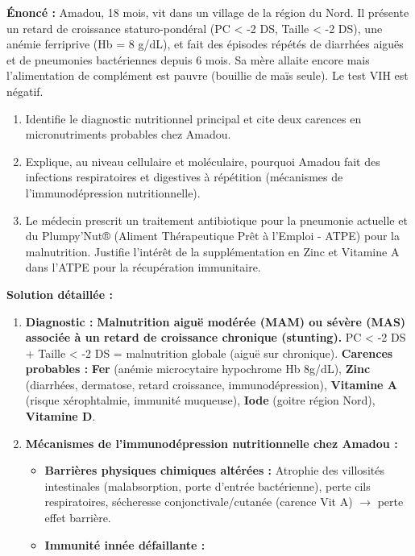 \documentclass[11pt]{article}
\begin{document}
\begin{exoresolu}
    \textbf{Énoncé :} Amadou, 18 mois, vit dans un village de la région du Nord. Il présente un retard de croissance staturo-pondéral (PC < -2 DS, Taille < -2 DS), une anémie ferriprive (Hb = 8 g/dL), et fait des épisodes répétés de diarrhées aiguës et de pneumonies bactériennes depuis 6 mois. Sa mère allaite encore mais l'alimentation de complément est pauvre (bouillie de maïs seule). Le test VIH est négatif.
    \begin{enumerate}
        \item Identifie le diagnostic nutritionnel principal et cite deux carences en micronutriments probables chez Amadou.
        \item Explique, au niveau cellulaire et moléculaire, pourquoi Amadou fait des infections respiratoires et digestives à répétition (mécanismes de l'immunodépression nutritionnelle).
        \item Le médecin prescrit un traitement antibiotique pour la pneumonie actuelle et du Plumpy'Nut® (Aliment Thérapeutique Prêt à l'Emploi - ATPE) pour la malnutrition. Justifie l'intérêt de la supplémentation en Zinc et Vitamine A dans l'ATPE pour la récupération immunitaire.
    \end{enumerate}
    \tcblower
    \textbf{Solution détaillée :}
    \begin{enumerate}
        \item \textbf{Diagnostic :} \textbf{Malnutrition aiguë modérée (MAM) ou sévère (MAS) associée à un retard de croissance chronique (stunting).} PC < -2 DS + Taille < -2 DS = malnutrition globale (aiguë sur chronique).
        \textbf{Carences probables :} \textbf{Fer} (anémie microcytaire hypochrome Hb 8g/dL), \textbf{Zinc} (diarrhées, dermatose, retard croissance, immunodépression), \textbf{Vitamine A} (risque xérophtalmie, immunité muqueuse), \textbf{Iode} (goitre région Nord), \textbf{Vitamine D}.
        \item \textbf{Mécanismes de l'immunodépression nutritionnelle chez Amadou :}
        \begin{itemize}
            \item \textbf{Barrières physiques chimiques altérées :} Atrophie des villosités intestinales (malabsorption, porte d'entrée bactérienne), perte cils respiratoires, sécheresse conjonctivale/cutanée (carence Vit A) $\rightarrow$ perte effet barrière.
            \item \textbf{Immunité innée défaillante :} 

\end{itemize}
\end{enumerate}
\end{exoresolu}
\end{document}
